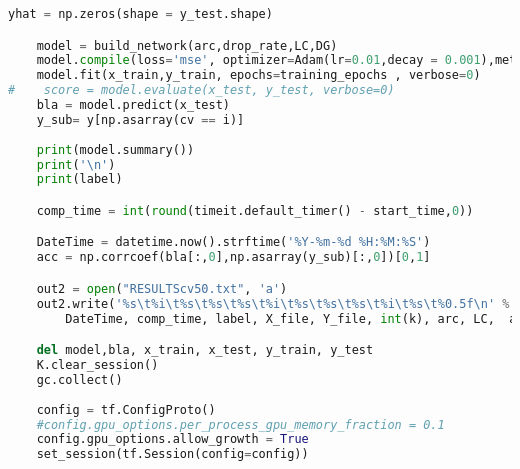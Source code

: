 \begin{lstlisting}[language=Python]
    yhat = np.zeros(shape = y_test.shape)

    model = build_network(arc,drop_rate,LC,DG)
    model.compile(loss='mse', optimizer=Adam(lr=0.01,decay = 0.001),metrics=['accuracy'])
    model.fit(x_train,y_train, epochs=training_epochs , verbose=0) 
#    score = model.evaluate(x_test, y_test, verbose=0)
    bla = model.predict(x_test)
    y_sub= y[np.asarray(cv == i)]
    
    print(model.summary())
    print('\n')
    print(label)        

    comp_time = int(round(timeit.default_timer() - start_time,0))

    DateTime = datetime.now().strftime('%Y-%m-%d %H:%M:%S')
    acc = np.corrcoef(bla[:,0],np.asarray(y_sub)[:,0])[0,1]

    out2 = open("RESULTScv50.txt", 'a')
    out2.write('%s\t%i\t%s\t%s\t%s\t%i\t%s\t%s\t%s\t%i\t%s\t%0.5f\n' % (
        DateTime, comp_time, label, X_file, Y_file, int(k), arc, LC,  act,int(training_epochs), drop_rate, round(acc,4)))

    del model,bla, x_train, x_test, y_train, y_test 
    K.clear_session() 
    gc.collect()
    
    config = tf.ConfigProto()
    #config.gpu_options.per_process_gpu_memory_fraction = 0.1
    config.gpu_options.allow_growth = True
    set_session(tf.Session(config=config))
\end{lstlisting}

